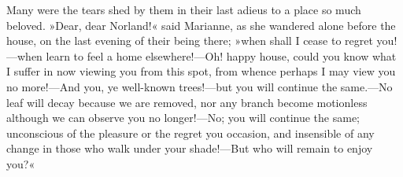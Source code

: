 Many were the tears shed by them in their last adieus to a place so much beloved. »Dear, dear Norland!« said Marianne, as she wandered alone before the house, on the last evening of their being there; »when shall I cease to regret you!—when learn to feel a home elsewhere!—Oh! happy house, could you know what I suffer in now viewing you from this spot, from whence perhaps I may view you no more!—And you, ye well-known trees!—but you will continue the same.—No leaf will decay because we are removed, nor any branch become motionless although we can observe you no longer!—No; you will continue the same; unconscious of the pleasure or the regret you occasion, and insensible of any change in those who walk under your shade!—But who will remain to enjoy you?«